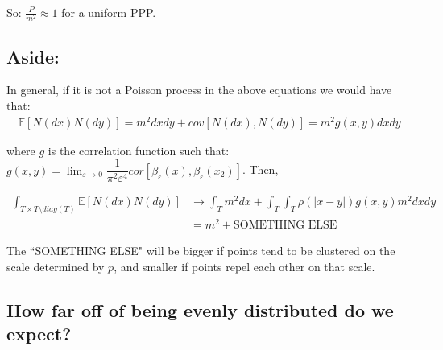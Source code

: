 \documentclass[12pt]{article}
\begin{document}
    \noindent So: $\frac{P}{m^2}\approx 1 $ for a uniform PPP.
    
    
    \subsection*{Aside:}
    In general, if it is not a Poisson process in the above equations we would have that: 
    $$\begin{aligned}
    \mathbb{E}[N(dx)N(dy)] = m^2dxdy +  cov[N(dx),N(dy)] = m^2g(x,y)dxdy
    \end{aligned}$$
    
    where $g$ is the correlation function such that:
    $g(x,y) = \lim_{\varepsilon \to 0} \dfrac{1}{\pi^2\varepsilon^4}cor[\beta_\varepsilon(x),\beta_\varepsilon(x_2)]$. Then,
    
    $$\begin{aligned}
    \int_{T\times T \setminus diag(T)}\mathbb{E}[N(dx)N(dy)] &\rightarrow \int_Tm^2dx + \int_T\int_T\rho(|x-y|)g(x,y)m^2dxdy \\
    &=  m^2 + \text{SOMETHING ELSE}
    \end{aligned}$$
    
    The ``SOMETHING ELSE" will be bigger if points tend to be clustered on the scale determined by $p$, and smaller if points repel each other on that scale.
    
    \subsection*{How far off of being evenly distributed do we expect?}
    
\end{document}
